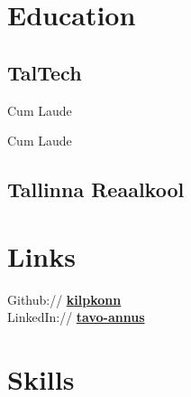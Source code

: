 \documentclass[]{deedy-resume-openfont}
\begin{document}
\begin{minipage}[t]{0.33\textwidth} %


\section{Education} 

\subsection{TalTech}

Cum Laude \\

\sectionspace %

Cum Laude \\

\sectionspace %

\subsection{Tallinna Reaalkool}


\sectionspace %


\section{Links} 

Github:// \href{https://github.com/kilpkonn}{\bf kilpkonn} \\
LinkedIn:// \href{https://www.linkedin.com/in/tavo-annus-4a5631171/}{\bf tavo-annus} \\

\sectionspace %


\section{Skills}


\end{minipage}
\end{document}
